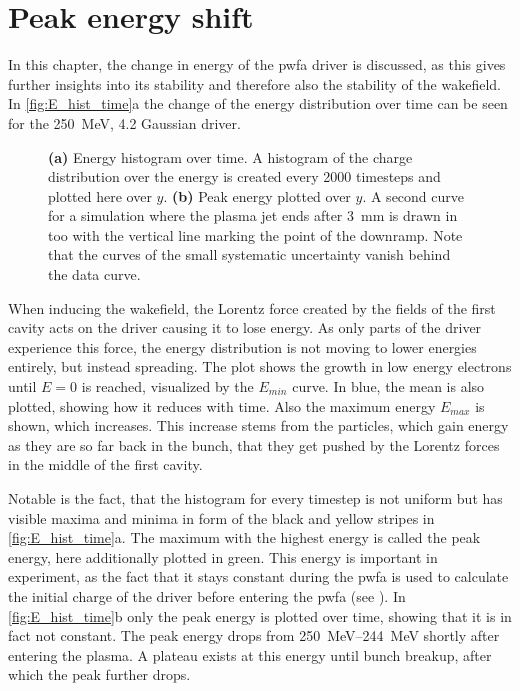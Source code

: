 \documentclass[bachelor_thesis]{subfiles}
\begin{document}
\section{Peak energy shift} \label{chap:E_shift}
In this chapter, the change in energy of the \gls{pwfa} driver is discussed, as this gives further insights into its stability and therefore also the stability of the wakefield.
In \autoref{fig:E_hist_time}a the change of the energy distribution over time can be seen for the \qty{250}{\MeV}, \qty{4.2}{\mrad} Gaussian driver.
\begin{figure}
	\centering
	
	\caption{
	\textbf{(a)} Energy histogram over time. A histogram of the charge distribution over the energy is created every 2000 timesteps and plotted here over $y$.
	\textbf{(b)} Peak energy plotted over $y$. A second curve for a simulation where the plasma jet ends after \qty{3}{\mm} is drawn in too with the vertical line marking the point of the downramp. Note that the curves of the small systematic uncertainty vanish behind the data curve.}
	\label{fig:E_hist_time}
\end{figure}
When inducing the wakefield, the Lorentz force created by the fields of the first cavity acts on the driver causing it to lose energy. As only parts of the driver experience this force, the energy distribution is not moving to lower energies entirely, but instead spreading.
The plot shows the growth in low energy electrons until $E=0$ is reached, visualized by the $E_{min}$ curve. In blue, the mean is also plotted, showing how it reduces with time. Also the maximum energy $E_{max}$ is shown, which increases.
This increase stems from the particles, which gain energy as they are so far back in the bunch, that they get pushed by the Lorentz forces in the middle of the first cavity.

Notable is the fact, that the histogram for every timestep is not uniform but has visible maxima and minima in form of the black and yellow stripes in \autoref{fig:E_hist_time}a. The maximum with the highest energy is called the peak energy, here additionally plotted in green.
This energy is important in experiment, as the fact that it stays constant during the \gls{pwfa} is used to calculate the initial charge of the driver before entering the \gls{pwfa} (see \cite{Schoebel2022}).
In \autoref{fig:E_hist_time}b only the peak energy is plotted over time, showing that it is in fact not constant. The peak energy drops from \qtyrange{250}{244}{\MeV} shortly after entering the plasma.
A plateau exists at this energy until bunch breakup, after which the peak further drops.
\end{document}
